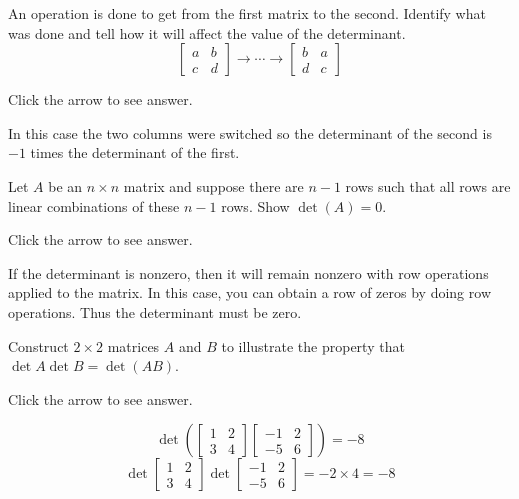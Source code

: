 \documentclass{ximera}
\begin{document}
\begin{problem}\label{prb:7.13} An operation is done to get from the first matrix to the second.
Identify what was done and tell how it will affect the value of the
determinant.
\begin{equation*}
\left[
\begin{array}{cc}
a & b \\
c & d
\end{array}
\right] \rightarrow \cdots \rightarrow \left[
\begin{array}{cc}
b & a \\
d & c
\end{array}
\right]
\end{equation*}

Click the arrow to see answer.
\begin{expandable}{}{}
In this case the two columns were switched so the determinant of the second
is $-1$ times the determinant of the first.
\end{expandable}
\end{problem}

\begin{problem}\label{prb:7.14} Let $A$ be an $n\times n$ matrix and suppose there are $n-1$ rows
such that all rows are linear combinations of these $n-1$
rows. Show $\det \left( A\right) =0$.

Click the arrow to see answer.
\begin{expandable}{}{}
If the determinant is nonzero, then it will remain nonzero with row operations applied to the matrix.
In this case, you can obtain a row of zeros by doing row
operations. Thus the determinant must be zero.
\end{expandable}
\end{problem}

\begin{problem}\label{prb:7.16} Construct $2\times 2$ matrices $A$ and $B$ to illustrate the property that
$\det A \det B = \det (AB)$.

Click the arrow to see answer.
\begin{expandable}{}{}
\[
\det
\left( \left[
\begin{array}{cc}
1 & 2 \\
3 & 4
\end{array}
\right] \left[
\begin{array}{rr}
-1 & 2 \\
-5 & 6
\end{array}
\right] \right) = -8
\]
\[
\det \left[
\begin{array}{cc}
1 & 2 \\
3 & 4
\end{array}
\right] \det \left[
\begin{array}{rr}
-1 & 2 \\
-5 & 6
\end{array}
\right] = -2 \times 4 = -8
\]
\end{expandable}
\end{problem}
\end{document}
